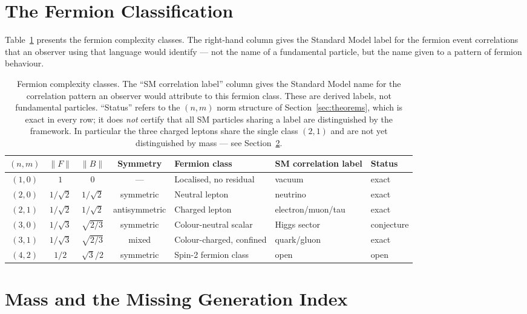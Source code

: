 \documentclass[11pt]{article}
\begin{document}
\section{The Fermion Classification}
\label{sec:dictionary}

Table~\ref{tab:dictionary} presents the fermion complexity classes.
The right-hand column gives the Standard Model label for the
fermion event correlations that an observer using that language
would identify --- not the name of a fundamental particle, but
the name given to a pattern of fermion behaviour.

\begin{table}[h]
\centering
\begin{tabular}{cccclll}
\toprule
$(n,m)$ & $\|F\|$ & $\|B\|$ & Symmetry & Fermion class
        & SM correlation label & Status \\
\midrule
$(1,0)$ & $1$ & $0$ & — &
  Localised, no residual & vacuum & exact \\
$(2,0)$ & $1/\sqrt{2}$ & $1/\sqrt{2}$ & symmetric &
  Neutral lepton & neutrino & exact \\
$(2,1)$ & $1/\sqrt{2}$ & $1/\sqrt{2}$ & antisymmetric &
  Charged lepton & electron/muon/tau & exact \\
$(3,0)$ & $1/\sqrt{3}$ & $\sqrt{2/3}$ & symmetric &
  Colour-neutral scalar & Higgs sector & conjecture \\
$(3,1)$ & $1/\sqrt{3}$ & $\sqrt{2/3}$ & mixed &
  Colour-charged, confined & quark/gluon & exact \\
$(4,2)$ & $1/2$ & $\sqrt{3}/2$ & symmetric &
  Spin-2 fermion class & open & open \\
\bottomrule
\end{tabular}
\caption{Fermion complexity classes.
The ``SM correlation label'' column gives the Standard Model name
for the correlation pattern an observer would attribute to this
fermion class.
These are derived labels, not fundamental particles.
``Status'' refers to the $(n,m)$ norm structure of
Section~\ref{sec:theorems}, which is exact in every row; it does
\emph{not} certify that all SM particles sharing a label are
distinguished by the framework.
In particular the three charged leptons share the single class
$(2,1)$ and are not yet distinguished by mass --- see
Section~\ref{sec:masses}.}
\label{tab:dictionary}
\end{table}

\section{Mass and the Missing Generation Index}
\label{sec:masses}
\end{document}
